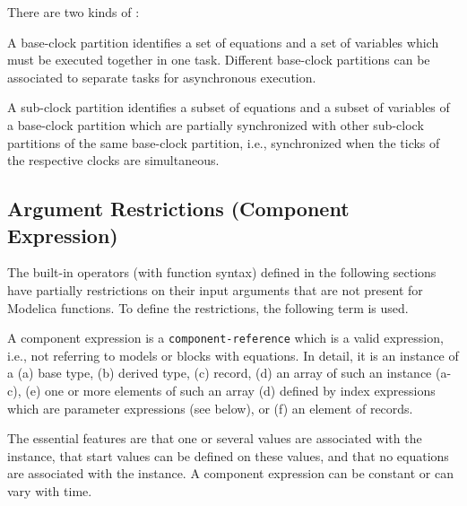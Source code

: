 There are two kinds of :

\begin{definition}
A base-clock partition identifies a set of equations and a set of variables which must be executed together in one task.
Different base-clock partitions can be associated to separate tasks for asynchronous execution.
\end{definition}

\begin{definition}
A sub-clock partition identifies a subset of equations and a subset of variables of a base-clock partition which are partially synchronized with other sub-clock partitions of the same base-clock
partition, i.e., synchronized when the ticks of the respective clocks are simultaneous.
\end{definition}

\subsection{Argument Restrictions (Component Expression)}\label{argument-restrictions-component-expression}

The built-in operators (with function syntax) defined in the following sections have partially restrictions on their input arguments that are not present for Modelica functions.
To define the restrictions, the following term is used.

\begin{definition}\label{def:component-expression}
A component expression is a \lstinline[language=grammar]!component-reference! which is a valid expression, i.e., not referring to models or blocks with equations.
In detail, it is an instance of a (a) base type, (b) derived type, (c) record, (d) an array of such an instance (a-c), (e) one or more elements of such an array (d) defined by index expressions which are parameter expressions (see below), or (f) an element of records.
\begin{nonnormative}
The essential features are that one or several values are associated with the instance, that start values can be defined on these values, and that no equations are associated with the instance.
A component expression can be constant or can vary with time.
\end{nonnormative}
\end{definition}

